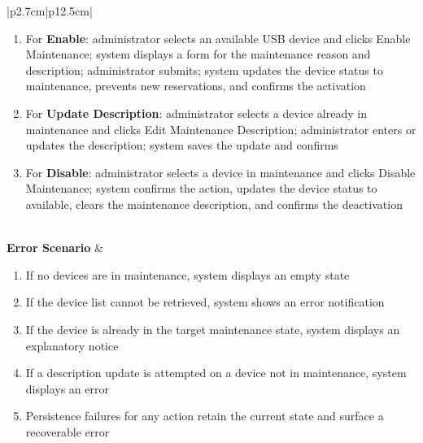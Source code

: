 \begin{table}[H]
\begin{tabular}{|p{2.7cm}|p{12.5cm}|}
\begin{minipage}[t]{\linewidth}
\begin{enumerate}[topsep=0pt,itemsep=1pt,parsep=0pt,partopsep=0pt]
                \item For \textbf{Enable}: administrator selects an available USB device and clicks Enable Maintenance; system displays a form for the maintenance reason and description; administrator submits; system updates the device status to maintenance, prevents new reservations, and confirms the activation
                \item For \textbf{Update Description}: administrator selects a device already in maintenance and clicks Edit Maintenance Description; administrator enters or updates the description; system saves the update and confirms
                \item For \textbf{Disable}: administrator selects a device in maintenance and clicks Disable Maintenance; system confirms the action, updates the device status to available, clears the maintenance description, and confirms the deactivation
            \end{enumerate}
        \end{minipage} \\
        \hline
        \textbf{Error Scenario} & \begin{minipage}[t]{\linewidth}
            \begin{enumerate}[topsep=0pt,itemsep=1pt,parsep=0pt,partopsep=0pt]
                \item If no devices are in maintenance, system displays an empty state
                \item If the device list cannot be retrieved, system shows an error notification
                \item If the device is already in the target maintenance state, system displays an explanatory notice
                \item If a description update is attempted on a device not in maintenance, system displays an error
                \item Persistence failures for any action retain the current state and surface a recoverable error
            \end{enumerate}
        \end{minipage} \\
        \hline
    \end{tabular}
    \label{tab:admin-usb-maintenance}
\end{table}

